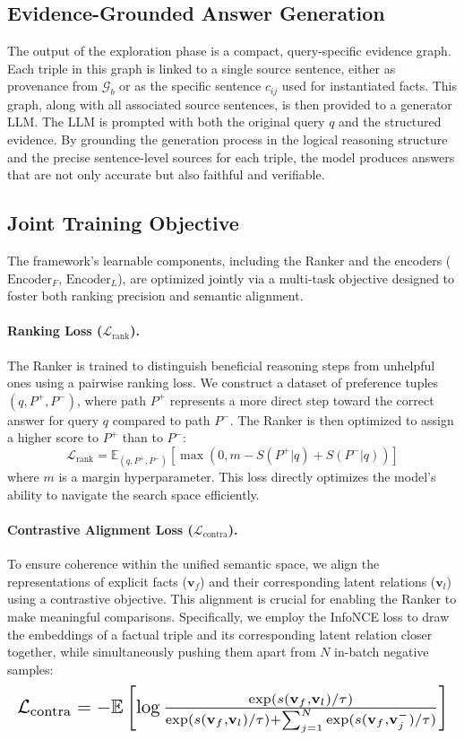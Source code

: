 \documentclass[letterpaper]{article} %
\begin{document}
\subsection{Evidence-Grounded Answer Generation}
The output of the exploration phase is a compact, query-specific evidence graph. Each triple in this graph is linked to a single source sentence, either as provenance from \(\mathcal{G}_b\) or as the specific sentence \(c_{ij}\) used for instantiated facts. This graph, along with all associated source sentences, is then provided to a generator LLM. The LLM is prompted with both the original query \(q\) and the structured evidence. By grounding the generation process in the logical reasoning structure and the precise sentence-level sources for each triple, the model produces answers that are not only accurate but also faithful and verifiable.


\subsection{Joint Training Objective}
The framework's learnable components, including the Ranker and the encoders ($\text{Encoder}_F$, $\text{Encoder}_L$), are optimized jointly via a multi-task objective designed to foster both ranking precision and semantic alignment.

\paragraph{Ranking Loss (\(\mathcal{L}_{\text{rank}}\)).} The Ranker is trained to distinguish beneficial reasoning steps from unhelpful ones using a pairwise ranking loss. We construct a dataset of preference tuples \((q, P^+, P^-)\), where path \(P^+\) represents a more direct step toward the correct answer for query \(q\) compared to path \(P^-\). The Ranker is then optimized to assign a higher score to \(P^+\) than to \(P^-\):
$$
\mathcal{L}_{\text{rank}} = \mathbb{E}_{(q, P^+, P^-)} \left[ \max(0, m - S(P^+|q) + S(P^-|q)) \right]
$$
where $m$ is a margin hyperparameter. This loss directly optimizes the model's ability to navigate the search space efficiently.

\paragraph{Contrastive Alignment Loss ($\mathcal{L}_{\text{contra}}$).}
\label{sec:training_objective}
To ensure coherence within the unified semantic space, we align the representations of explicit facts (\(\mathbf{v}_f\)) and their corresponding latent relations (\(\mathbf{v}_l\)) using a contrastive objective. This alignment is crucial for enabling the Ranker to make meaningful comparisons. Specifically, we employ the InfoNCE loss to draw the embeddings of a factual triple and its corresponding latent relation closer together, while simultaneously pushing them apart from \(N\) in-batch negative samples:
$$
\label{eq:contra_loss_resize}
\resizebox{1.0\linewidth}{!}{$
\mathcal{L}_{\text{contra}} = -\mathbb{E} \left[ \log \frac{\exp(s(\mathbf{v}_f, \mathbf{v}_l)/\tau)}{\exp(s(\mathbf{v}_f, \mathbf{v}_l)/\tau) + \sum_{j=1}^N \exp(s(\mathbf{v}_f, \mathbf{v}_j^{-})/\tau)} \right]
$}
$$
\end{document}
